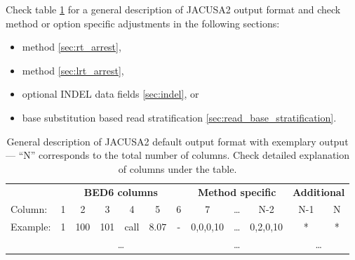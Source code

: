 \documentclass[10pt,a4paper]{article} \usepackage[utf8]{inputenc}
\begin{document}
Check table \ref{tbl:general_output} for a general description of JACUSA2 output format and check
method or option specific adjustments in the following sections:
\begin{itemize}
  \item \rtarrest method \ref{sec:rt_arrest},
  \item \lrtarrest method \ref{sec:lrt_arrest},
  \item optional INDEL data fields \ref{sec:indel}, or
  \item base substitution based read stratification \ref{sec:read_base_stratification}.
\end{itemize}
\begin{table}[ht]
  \centering 
  \caption{General description of JACUSA2 default output format with exemplary 
  output --- ``N'' corresponds to the total number of columns. Check detailed explanation of columns
  under the table.}
  \label{tbl:general_output}
{\small
\begin{tabular}{l|cccccc|ccc|cc}
         & \multicolumn{6}{c|}{\textbf{BED6 columns}} & \multicolumn{3}{c}{\textbf{Method specific}} & \multicolumn{2}{c}{\textbf{Additional}} \\
Column:  & 1 & 2 & 3 & 4 & 5 & 6 & 7 & \ldots & N-2 & N-1 & N \\
\hline
Example: & 1 & 100 & 101 & call & $8.07$ & - & 0,0,0,10 & \ldots & 0,2,0,10 & * & * \\
         & \multicolumn{6}{c|}{\ldots} & \multicolumn{3}{c}{\ldots} & \multicolumn{2}{c}{\ldots} \\
\end{tabular}}
\end{table}
\end{document}
